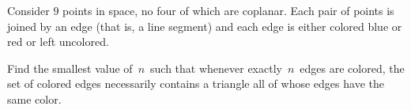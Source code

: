 Consider $9$
 points in space, no four of which are coplanar. Each pair of points is 
joined by an edge (that is, a line segment) and each edge is either 
colored blue or red or left uncolored.

Find the smallest value of  $\,n\,$ such that whenever exactly $\,n\,$ edges are colored, the set of colored edges necessarily contains a triangle all of whose edges have the same color.
